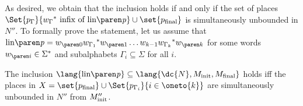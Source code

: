 \documentclass[../../diss.tex]{subfiles}
\begin{document}
As desired, we obtain that the inclusion holds if and only if the set of places $\Set{ p_{\Gamma}}{ {w_{\Gamma}}^* \text{ infix of } \linof{\product}} \cup \set{p_\final}$ is simultaneously unbounded in $N''$.
To formally prove the statement, let us assume that $\linof{\product} = \dtr{w}{0} {w_{\Gamma_1}}^* \dtr{w}{1} \ldots w_{k-1} {w_{\Gamma_k}}^* \dtr{w}{k}$ for some words $\dtr{w}{i} \in \Sigma^*$ and subalphabets $\Gamma_i\subseteq \Sigma$ for all $i$.

\begin{proposition}%
\label{Proposition:PNSREDCReduction}%
    The inclusion
    $\lang{\linof{\product}} \subseteq \lang{\mathmbox{\dc{N}}, \Minit, \Mfinal}$
    holds iff the places in
    $X = \set{ p_\final } \cup \Set{ p_{\Gamma_i}}{i \in \oneto{k}}$
    are simultaneously unbounded in $N''$ from $M_{\text{init}}''$.
\end{proposition}
\end{document}
